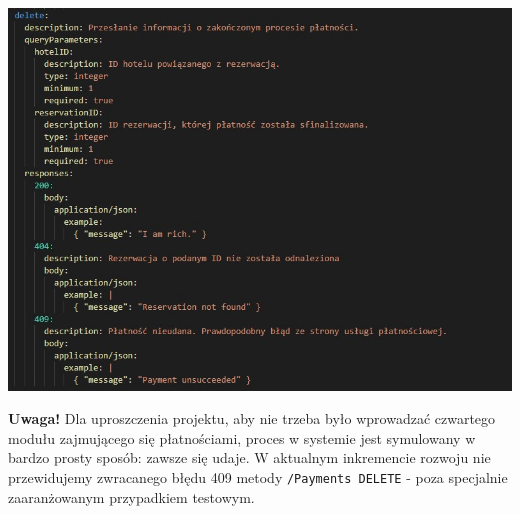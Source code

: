 \documentclass{article}
\begin{document}
\includegraphics[scale=0.7]{Rezerwacje/paymentsDELETE.jpg}

\textbf{Uwaga!} Dla uproszczenia projektu, aby nie trzeba było wprowadzać czwartego modułu zajmującego się płatnościami, proces w systemie jest symulowany w bardzo prosty sposób: zawsze się udaje. W aktualnym inkremencie rozwoju nie przewidujemy zwracanego błędu 409 metody \texttt{/Payments DELETE} - poza specjalnie zaaranżowanym przypadkiem testowym.
\end{document}
